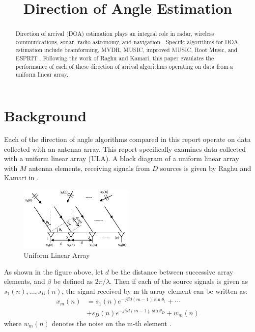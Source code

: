 \documentclass[conference]{IEEEtran}
\begin{document}
\title{Direction of Angle Estimation}

\author{
}
\maketitle

\begin{abstract}
	Direction of arrival (DOA) estimation plays an integral role in radar, wireless communications, sonar, radio astronomy, and navigation \cite{doa_algorithms_raghu}. Specific algorithms for DOA estimation include beamforming, MVDR, MUSIC, improved MUSIC, Root Music, and ESPRIT \cite{doa_algorithms_raghu}. Following the work of Raghu and Kamari, this paper evaulates the performance of each of these direction of arrival algorithms operating on data from a uniform linear array. 
\end{abstract}

	\section{Background}
	
	Each of the direction of angle algorithms compared in this report operate on data collected with an antenna array. This report specifically examines data collected with a uniform linear array (ULA). A block diagram of a uniform linear array with $M$ antenna elements, receiving signals from $D$ sources is given by Raghu and Kamari in \cite{doa_algorithms_raghu}.
	
	\begin{figure}[H]
		\centerline{\includegraphics[width=0.5\textwidth]{uniform_linear_array.png}}
		\caption{Uniform Linear Array \cite{doa_algorithms_raghu}}
		\label{Monte Carlo Estimate}
	\end{figure}
	
	As shown in the figure above, let $d$ be the distance between successive array elements, and $\beta$ be defined as $2\pi/\lambda$. Then if each of the source signals is given as $s_1(n),...,s_D(n)$, the signal received by m-th array element can be written as:
	\begin{equation}
		\label{received_signal}
		\begin{split}
			x_m(n) &= s_1(n)e^{-j{\beta}d(m-1)\sin{\theta_1}} + \cdots\\
			&+ s_D(n)e^{-j{\beta}d(m-1)\sin{\theta_D}} + w_m(n)
		\end{split}
	\end{equation}
	where $w_m(n)$ denotes the noise on the m-th element \cite{doa_algorithms_raghu}.
	
\end{document}
